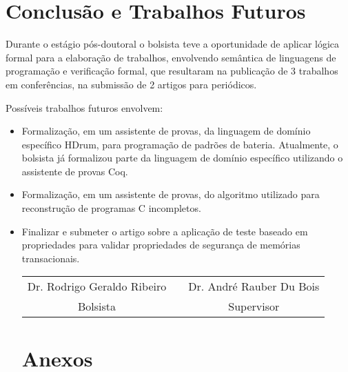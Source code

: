 \documentclass[a4paper, 12pt]{article}
\begin{document}
\section{Conclusão e Trabalhos Futuros}

Durante o estágio pós-doutoral o bolsista teve a oportunidade de aplicar lógica
formal para a elaboração de trabalhos, envolvendo semântica de
linguagens de programação e verificação formal, que resultaram na publicação de
3 trabalhos em conferências, na submissão de 2 artigos para periódicos. 

Possíveis trabalhos futuros envolvem:

\begin{itemize}
  \item Formalização, em um assistente de provas, da linguagem de domínio
    específico HDrum, para programação de padrões de bateria. Atualmente, o
    bolsista já formalizou parte da linguagem de domínio específico utilizando o
    assistente de provas Coq.
  \item Formalização, em um assistente de provas, do algoritmo utilizado para
        reconstrução de programas C incompletos.
  \item Finalizar e submeter o artigo sobre a aplicação de teste baseado em propriedades
    para validar propriedades de segurança de memórias transacionais.

\vspace{5cm}

\begin{center}
  \begin{tabular}{ccc}
    Dr. Rodrigo Geraldo Ribeiro & \hspace{2cm} & Dr. André Rauber Du Bois \\
    Bolsista                    &              & Supervisor
  \end{tabular}
\end{center}
\newpage    
\section*{Anexos}

\end{itemize}
\end{document}
